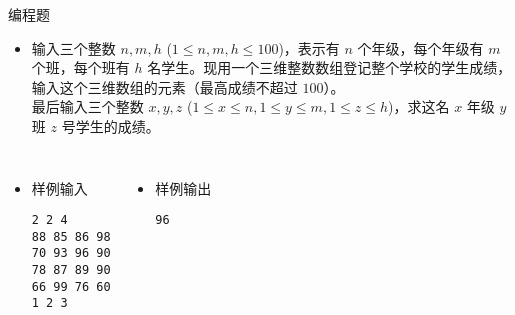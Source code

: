 \begin{frame}[fragile]
{\begin{exampleblock}{编程题}
            \begin{itemize}
                \item 输入三个整数 $n, m, h$ ($1 \le n, m, h \le 100$)，表示有 $n$ 个年级，每个年级有 $m$ 个班，每个班有 $h$ 名学生。现用一个三维整数数组登记整个学校的学生成绩，输入这个三维数组的元素（最高成绩不超过 $100$）。\\
                    最后输入三个整数 $x, y, z$  ($1 \le x \le n, 1 \le y \le m, 1 \le z \le h$)，求这名 $x$ 年级 $y$ 班 $z$ 号学生的成绩。
            \end{itemize}

            \begin{columns}[onlytextwidth,T]
                \begin{itemize}
                    \item 样例输入

                        \lstinline|2 2 4|\\
                        \lstinline|88 85 86 98|\\
                        \lstinline|70 93 96 90|\\
                        \lstinline|78 87 89 90|\\
                        \lstinline|66 99 76 60|\\
                        \lstinline|1 2 3|\\
                \end{itemize}

                \begin{itemize}
                    \item 样例输出

                        \lstinline|96|
                \end{itemize}
            \end{columns}

        \end{exampleblock}
    }
\end{frame}

